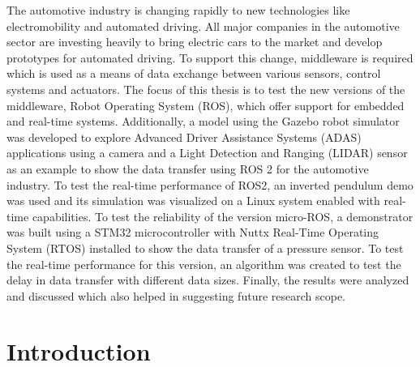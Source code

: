 \documentclass[%
xelatex,
	oneside,		%
	12pt,			%
	parskip=half,	%
	abstracton,
	chapterprefix=true%
    appendixprefix=true]
{scrbook}
\begin{document}
The automotive industry is changing rapidly to new technologies like electromobility and automated driving. All major companies in the automotive sector are investing heavily to bring electric cars to the market and develop prototypes for automated driving. To support this change, middleware is required which is used as a means of data exchange between various sensors, control systems and actuators. The focus of this thesis is to test the new versions of the middleware, Robot Operating System (ROS), which offer support for embedded and real-time systems. Additionally, a model using the Gazebo robot simulator was developed to explore  Advanced Driver Assistance Systems (ADAS) applications using a camera and a Light Detection and Ranging (LIDAR) sensor as an example to show the data transfer using ROS 2 for the automotive industry. To test the real-time performance of ROS2, an inverted pendulum demo was used and its simulation was visualized on a Linux system enabled with real-time capabilities. To test the reliability of the version micro-ROS, a demonstrator was built using a STM32 microcontroller with Nuttx Real-Time Operating System (RTOS) installed to show the data transfer of a pressure sensor. To test the real-time performance for this version, an algorithm was created to test the delay in data transfer with different data sizes. Finally, the results were analyzed and discussed which also helped in suggesting future research scope.
\clearpage

	
\rofoot[\pagemark]{\pagemark}
\printnomenclature
	

	\tableofcontents
	
	


	\chapter{Introduction}

\rofoot[\pagemark]{\pagemark}
\end{document}
